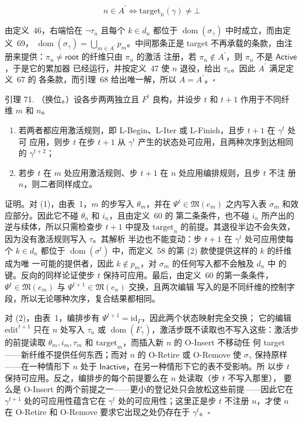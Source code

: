 \documentclass[
  10
]{article}
\providecommand{\tightlist}{%
  \setlength{\itemsep}{0pt}\setlength{\parskip}{0pt}}
\begin{document}
\[
n \in A^{\prime} \Longleftrightarrow \mathrm{target}_{n}(\gamma) \neq \bot
\]

由定义~46，右端恰在 \(\neg \tau_{n}\) 且每个 \(k \in d_{n}\) 都位于
\(\operatorname{dom}(\sigma_{\gamma})\) 中时成立，而由定义~69，
\(\operatorname{dom}(\sigma_{\gamma}) = \bigcup_{m \in A^{\prime}} p_{m}\)。中间那条正是 target
不再承载的条款，由注册来提供：\(\pi_{n} \neq \mathsf{root}\) 的纤维只由 \(\pi_{n}\) 的激活
注册，若 \(\pi_{n} \notin A^{\prime}\)，则 \(\pi_{n}\) 不是 \(\mathsf{Active}\)，于是它的累加器
已经运行，并按定义~47 使 \(n\) 退役，给出 \(\tau_{n}\)。因此 \(A^{\prime}\) 满足定义~67 的
各条款，而引理~68 给出唯一解，所以 \(A = A^{\prime}\)。\(\square\)

引理 71. （换位。）设各步两两独立且 \(F^{t}\) 良构，并设步 \(t\) 和 \(t+1\) 作用于不同纤
维 \(m\) 和 \(n\)。

\begin{enumerate}
\def\labelenumi{\arabic{enumi}.}
\tightlist
\item
  若两者都应用激活规则，即 L-Begin、L-Iter 或 L-Finish，且步 \(t+1\) 在 \(\gamma^{t}\) 处可
  应用，则步 \(t\) 在步 \(t+1\) 从 \(\gamma^{t}\) 产生的状态处可应用，且两种次序到达相同的
  \(\gamma^{t+2}\)；
\item
  若步 \(t\) 在 \(m\) 处应用激活规则、步 \(t+1\) 在 \(n\) 处应用编排规则，且步 \(t\) 不注
  册 \(n\)，则二者同样成立。
\end{enumerate}

证明。对 (1)，由表~1，\(m\) 的步写入 \(\theta_{m}\)，并在 \(\Psi^{t} \in \mathfrak{M}(e_{m})\)
之内写入表 \(\sigma_{m}\) 和效应部分。因此它不碰 \(\theta_{n}\) 和 \(i_{n}\)，且由定义~60 的
第二条条件，也不碰 \(i_{n}\) 所产出的逆与续体，所以只需检查步 \(t+1\) 中提及
\(\mathrm{target}_{n}\) 的前提。其退役半边不会失效，因为没有激活规则写入 \(\tau\)。其解析
半边也不能变动：步 \(t+1\) 在 \(\gamma^{t}\) 处可应用使每个 \(k \in d_{n}\) 都位于
\(\operatorname{dom}(\sigma^{t})\) 中，而定义~58 的第 (2) 款使提供这样的 \(k\) 的纤维成为唯
一可能的提供者，因此 \(k \notin p_{m}\)，对 \(\sigma_{m}\) 的任何写入都不会触及 \(d_{n}\) 中
的键。反向的同样论证使步 \(t\) 保持可应用。最后，由定义~60 的第一条条件，
\(\Psi^{t} \in \mathfrak{M}(e_{m})\) 与 \(\Psi^{t+1} \in \mathfrak{M}(e_{n})\) 交换，且两次编辑
写入的是不同纤维的控制字段，所以无论哪种次序，复合结果都相同。

对 (2)，由表~1，编排步有 \(\Psi^{t+1} = \mathrm{id}_{\Gamma}\)，因此两个状态映射完全交换；
它的编辑 \(\mathrm{edit}^{t+1}\) 只在 \(n\) 处写入 \(\tau_{n}\) 或
\(\operatorname{dom}(F_{\gamma})\)，激活步既不读取也不写入这些：激活步的前提读取
\(\theta_{m}, i_{m}, \tau_{m}\) 和 \(\mathrm{target}_{m}\)，而插入新 \(n\) 的 O-Insert 不移动任
何 target——新纤维不提供任何东西；而对 \(n\) 的 O-Retire 或 O-Remove 使 \(\sigma_{\gamma}\)
保持原样——在一种情形下 \(n\) 处于 \(\mathsf{Inactive}\)，在另一种情形下它的表不受影响。所
以步 \(t\) 保持可应用。反之，编排步的每个前提要么在 \(n\) 处读取（步 \(t\) 不写入那里），
要么是 O-Insert 的两个前提之一——更小的登记处只会放松这些前提——因此它在
\(\gamma^{t+1}\) 处的可应用性蕴含它在 \(\gamma^{t}\) 处的可应用性；这里正是步 \(t\) 不注册
\(n\)，才使 \(n\) 在 O-Retire 和 O-Remove 要求它出现之处仍存在于 \(\gamma^{t}\)。\(\square\)
\end{document}
